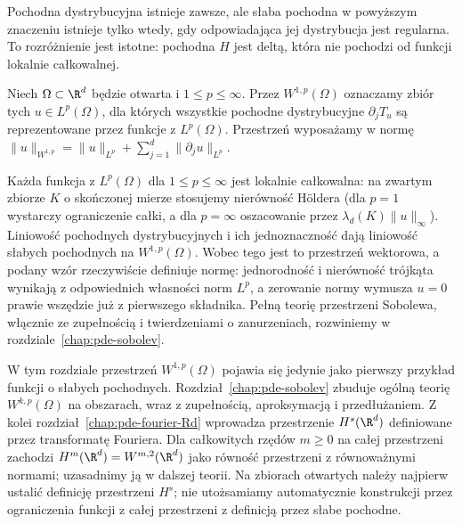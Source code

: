 Pochodna dystrybucyjna istnieje zawsze, ale słaba
pochodna w powyższym znaczeniu istnieje tylko wtedy,
gdy odpowiadająca jej dystrybucja jest regularna.
To rozróżnienie jest istotne: pochodna $H$ jest deltą,
która nie pochodzi od funkcji lokalnie całkowalnej.

\begin{definicja}[Przestrzeń $W^{1,p}$]
Niech $\Omega\subset\R^d$ będzie otwarta i $1\le p\le\infty$.
Przez $W^{1,p}(\Omega)$ oznaczamy zbiór tych
$u\in L^p(\Omega)$, dla których wszystkie pochodne
dystrybucyjne $\partial_jT_u$ są reprezentowane przez
funkcje z $L^p(\Omega)$. Przestrzeń wyposażamy w normę
$\|u\|_{W^{1,p}}=\|u\|_{L^p}+\sum_{j=1}^d
\|\partial_ju\|_{L^p}$.
\end{definicja}

Każda funkcja z $L^p(\Omega)$ dla $1\le p\le\infty$
jest lokalnie całkowalna: na zwartym zbiorze $K$
o skończonej mierze stosujemy nierówność Höldera
(dla $p=1$ wystarczy ograniczenie całki, a dla
$p=\infty$ oszacowanie przez $\lambda_d(K)\|u\|_\infty$).
Liniowość pochodnych dystrybucyjnych i ich jednoznaczność
dają liniowość słabych pochodnych na $W^{1,p}(\Omega)$.
Wobec tego jest to przestrzeń wektorowa, a podany
wzór rzeczywiście definiuje normę: jednorodność
i nierówność trójkąta wynikają z odpowiednich
własności norm $L^p$, a zerowanie normy wymusza
$u=0$ prawie wszędzie już z pierwszego składnika.
Pełną teorię przestrzeni Sobolewa, włącznie ze
zupełnością i twierdzeniami o zanurzeniach,
rozwiniemy w rozdziale~\ref{chap:pde-sobolev}.

\begin{uwaga}
W tym rozdziale przestrzeń $W^{1,p}(\Omega)$ pojawia się
jedynie jako pierwszy przykład funkcji o słabych pochodnych.
Rozdział~\ref{chap:pde-sobolev} zbuduje ogólną teorię
$W^{k,p}(\Omega)$ na obszarach, wraz z zupełnością,
aproksymacją i przedłużaniem. Z kolei
rozdział~\ref{chap:pde-fourier-Rd} wprowadza
przestrzenie $H^s(\R^d)$ definiowane przez transformatę Fouriera.
Dla całkowitych rzędów $m\ge0$ na całej przestrzeni
zachodzi $H^m(\R^d)=W^{m,2}(\R^d)$ jako równość
przestrzeni z równoważnymi normami; uzasadnimy
ją w dalszej teorii. Na zbiorach otwartych należy
najpierw ustalić definicję przestrzeni $H^s$;
nie utożsamiamy automatycznie konstrukcji przez
ograniczenia funkcji z całej przestrzeni z definicją
przez słabe pochodne.
\end{uwaga}

